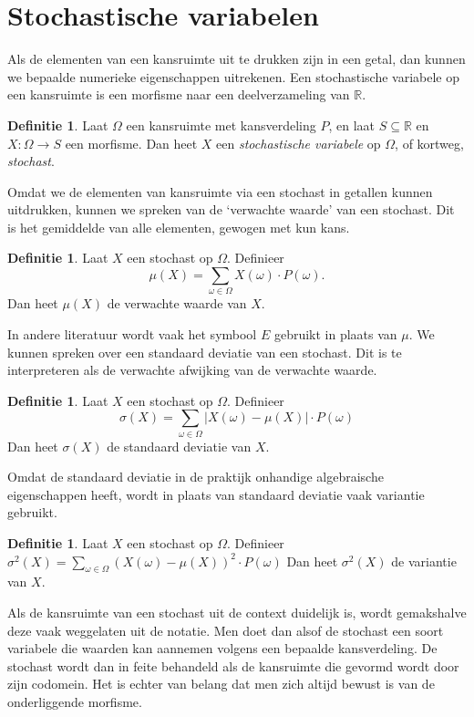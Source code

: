 \documentclass[a4paper]{book}
\theoremstyle{definition}
\newtheorem{definition}[theorem]{Definitie}
\newcommand{\reals}{\mathbb{R}}
\begin{document}
\section{Stochastische variabelen}

Als de elementen van een kansruimte uit te drukken zijn in een getal, dan kunnen we bepaalde numerieke eigenschappen uitrekenen.
Een stochastische variabele op een kansruimte is een morfisme naar een deelverzameling van $\reals$.

\begin{definition}
    Laat $\Omega$ een kansruimte met kansverdeling $P$, en laat $S \subseteq \reals$ en $X : \Omega \to S$ een morfisme.
    Dan heet $X$ een \emph{stochastische variabele} op $\Omega$, of kortweg, \emph{stochast}.
\end{definition}

Omdat we de elementen van kansruimte via een stochast in getallen kunnen uitdrukken, kunnen we spreken van de `verwachte waarde' van een stochast.
Dit is het gemiddelde van alle elementen, gewogen met kun kans.

\begin{definition}
    Laat $X$ een stochast op $\Omega$.
    Definieer \[ \mu(X) = \sum_{\omega \in \Omega} X(\omega) \cdot P(\omega). \]
    Dan heet $\mu(X)$ de verwachte waarde van $X$.
\end{definition}

In andere literatuur wordt vaak het symbool $E$ gebruikt in plaats van $\mu$.
We kunnen spreken over een standaard deviatie van een stochast. Dit is te interpreteren als de verwachte afwijking van de verwachte waarde.

\begin{definition}
    Laat $X$ een stochast op $\Omega$.
    Definieer \[ \sigma(X) = \sum_{\omega \in \Omega} |X(\omega) - \mu(X)| \cdot P(\omega) \]
    Dan heet $\sigma(X)$ de standaard deviatie van $X$.
\end{definition}

Omdat de standaard deviatie in de praktijk onhandige algebraische eigenschappen heeft, wordt in plaats van standaard deviatie vaak variantie gebruikt.

\begin{definition}
    Laat $X$ een stochast op $\Omega$.
    Definieer $ \sigma^2(X) = \sum_{\omega \in \Omega} {(X(\omega) - \mu(X))}^2 \cdot P(\omega) $
    Dan heet $\sigma^2(X)$ de variantie van $X$.
\end{definition}

Als de kansruimte van een stochast uit de context duidelijk is, wordt gemakshalve deze vaak weggelaten uit de notatie.
Men doet dan alsof de stochast een soort variabele die waarden kan aannemen volgens een bepaalde kansverdeling.
De stochast wordt dan in feite behandeld als de kansruimte die gevormd wordt door zijn codomein.
Het is echter van belang dat men zich altijd bewust is van de onderliggende morfisme.
\end{document}
